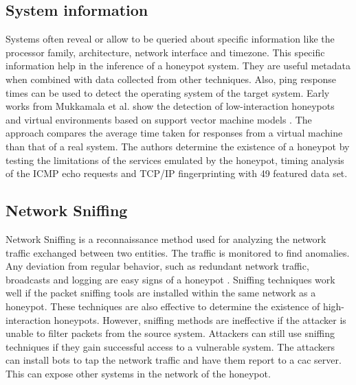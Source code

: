\subsection{System information}
Systems often reveal or allow to be queried about specific information like the processor family, architecture, network interface and timezone. This specific information help in the inference of a honeypot system. They are useful metadata when combined with data collected from other techniques.  Also, ping response times can be used to detect the operating system of the target system. Early works from Mukkamala et al.  show the detection of low-interaction honeypots and virtual environments based on support vector machine models \cite{mukkamala}. The approach compares the average time taken for responses from a virtual machine than that of a real system. The authors determine the existence of a honeypot by testing the limitations of the services emulated by the honeypot, timing analysis of the ICMP echo requests and TCP/IP fingerprinting with 49 featured data set.  

\subsection{Network Sniffing}
Network Sniffing is a reconnaissance method used for analyzing the network traffic exchanged between two entities. The traffic is monitored to find anomalies. Any deviation from regular behavior, such as redundant network traffic, broadcasts and logging are easy signs of a honeypot . Sniffing techniques work well if the packet sniffing tools are installed within the same network as a honeypot. These techniques are also effective to determine the existence of high-interaction honeypots. However, sniffing methods are ineffective if the attacker is unable to filter packets from the source system. Attackers can still use sniffing techniques if they gain successful access to a vulnerable system. The attackers can install bots to tap the network traffic and have them report to a \acrshort{cac}  server. This can expose other systems in the network of the honeypot. 


